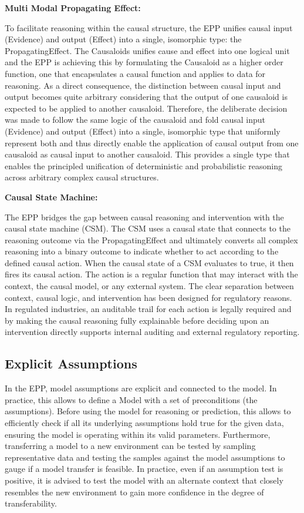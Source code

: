 \textbf{Multi Modal Propagating Effect:}
  
To facilitate reasoning within the causal structure, the EPP unifies causal input (Evidence) and output (Effect) into a single, isomorphic type: the PropagatingEffect. The Causaloids unifies cause and effect into one logical unit and the EPP is achieving this by formulating the Causaloid as a higher order function, one that encapsulates a causal function and applies to data for reasoning. As a direct consequence, the distinction between causal input and output becomes quite arbitrary considering that the output of one causaloid is expected to be applied to another causaloid. Therefore, the deliberate decision was made to follow the same logic of the causaloid and fold causal input (Evidence) and output (Effect) into a single, isomorphic type that uniformly represent both and thus directly enable the application of causal output from one causaloid as causal input to another causaloid. This provides a single type that enables the principled unification of deterministic and probabilistic reasoning across arbitrary complex causal structures. 
 

\textbf{Causal State Machine:}

The EPP bridges the gap between causal reasoning and intervention with the causal state machine (CSM). The CSM uses a causal state that connects to the reasoning outcome via the  PropagatingEffect and ultimately converts all complex reasoning into a binary outcome to indicate whether to act according to the defined causal action. When the causal state of a CSM evaluates to true, it then fires its causal action. The action is a regular function that may interact with the context, the causal model, or any external system. The clear separation between context, causal logic, and intervention has been designed for regulatory reasons. In regulated industries, an auditable trail for each action is legally required  and by making the causal reasoning fully explainable before deciding upon an intervention directly supports internal auditing and external regulatory reporting.   

\newpage

%
%
\subsection{Explicit Assumptions}
\label{sec:assumptions}
 
 In the EPP, model assumptions are explicit and connected to the model.  In practice, this allows to define a Model with a set of preconditions (the
  assumptions). Before using the model for reasoning or prediction, this allows to efficiently check if all its underlying
  assumptions hold true for the given data, ensuring the model is operating within its  valid parameters. Furthermore, transferring a model to a new environment can be
  tested by sampling representative data and testing the samples against the model assumptions to gauge if a model transfer is feasible. In practice, even if an assumption test is positive, it is advised to test the model with an alternate context that closely resembles the new environment to gain more confidence in the degree of transferability. 
 

